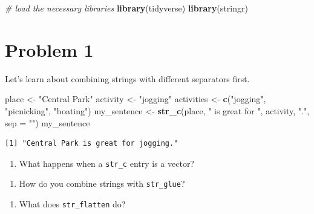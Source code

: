 \documentclass[
]{book}
\newenvironment{Shaded}{\begin{snugshade}}{\end{snugshade}}
\newcommand{\AttributeTok}[1]{\textcolor[rgb]{0.13,0.29,0.53}{#1}}
\newcommand{\CommentTok}[1]{\textcolor[rgb]{0.56,0.35,0.01}{\textit{#1}}}
\newcommand{\FunctionTok}[1]{\textcolor[rgb]{0.13,0.29,0.53}{\textbf{#1}}}
\newcommand{\NormalTok}[1]{#1}
\newcommand{\OtherTok}[1]{\textcolor[rgb]{0.56,0.35,0.01}{#1}}
\newcommand{\StringTok}[1]{\textcolor[rgb]{0.31,0.60,0.02}{#1}}
\providecommand{\tightlist}{%
  \setlength{\itemsep}{0pt}\setlength{\parskip}{0pt}}
\begin{document}
\begin{Shaded}
\begin{Highlighting}[]
\CommentTok{\# load the necessary libraries}
\FunctionTok{library}\NormalTok{(tidyverse)}
\FunctionTok{library}\NormalTok{(stringr)}
\end{Highlighting}
\end{Shaded}

\hypertarget{problem-1}{%
\section{Problem 1}\label{problem-1}}

Let's learn about combining strings with different separators first.

\begin{Shaded}
\begin{Highlighting}[]
\NormalTok{place }\OtherTok{\textless{}{-}} \StringTok{"Central Park"}
\NormalTok{activity }\OtherTok{\textless{}{-}} \StringTok{"jogging"}
\NormalTok{activities }\OtherTok{\textless{}{-}} \FunctionTok{c}\NormalTok{(}\StringTok{"jogging"}\NormalTok{, }\StringTok{"picnicking"}\NormalTok{, }\StringTok{"boating"}\NormalTok{)}
\NormalTok{my\_sentence }\OtherTok{\textless{}{-}} \FunctionTok{str\_c}\NormalTok{(place, }\StringTok{" is great for "}\NormalTok{, activity, }\StringTok{"."}\NormalTok{, }\AttributeTok{sep =} \StringTok{""}\NormalTok{)}
\NormalTok{my\_sentence}
\end{Highlighting}
\end{Shaded}

\begin{verbatim}
[1] "Central Park is great for jogging."
\end{verbatim}

\begin{enumerate}
\def\labelenumi{\alph{enumi}.}
\tightlist
\item
  What happens when a \texttt{str\_c} entry is a vector?
\end{enumerate}

\begin{enumerate}
\def\labelenumi{\alph{enumi}.}
\setcounter{enumi}{1}
\tightlist
\item
  How do you combine strings with \texttt{str\_glue}?
\end{enumerate}

\begin{enumerate}
\def\labelenumi{\alph{enumi}.}
\setcounter{enumi}{2}
\tightlist
\item
  What does \texttt{str\_flatten} do?
\end{enumerate}
\end{document}
